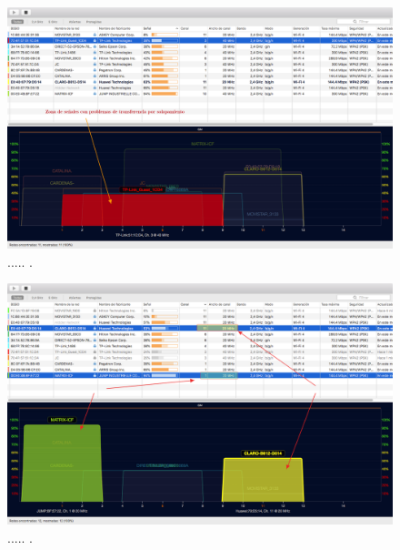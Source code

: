 \begin{landscape} %
\begin{figure}[htpb]
\centering 
\includegraphics[width=1.5\textwidth]{./Figures/wifi/04.png}
\caption{..... .}
\label{fig:test04}
\end{figure}
\end{landscape} %



\begin{landscape} %
\begin{figure}[htpb]
\centering 
\includegraphics[width=1.5\textwidth]{./Figures/wifi/05.png}
\caption{..... .}
\label{fig:test05}
\end{figure}
\end{landscape} %



